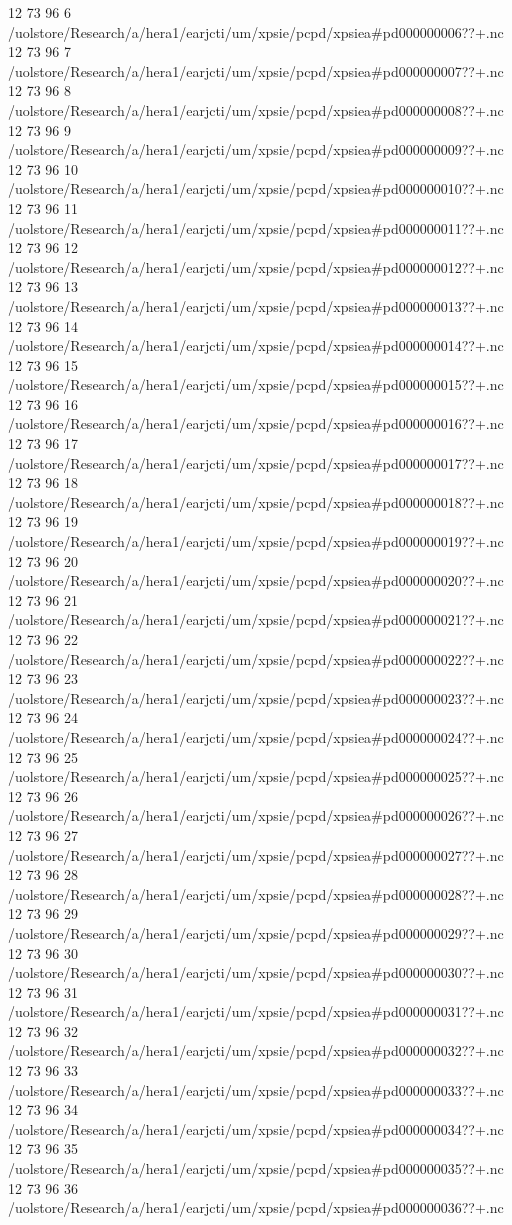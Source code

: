 12 73 96
6
/uolstore/Research/a/hera1/earjcti/um/xpsie/pcpd/xpsiea#pd000000006??+.nc
12 73 96
7
/uolstore/Research/a/hera1/earjcti/um/xpsie/pcpd/xpsiea#pd000000007??+.nc
12 73 96
8
/uolstore/Research/a/hera1/earjcti/um/xpsie/pcpd/xpsiea#pd000000008??+.nc
12 73 96
9
/uolstore/Research/a/hera1/earjcti/um/xpsie/pcpd/xpsiea#pd000000009??+.nc
12 73 96
10
/uolstore/Research/a/hera1/earjcti/um/xpsie/pcpd/xpsiea#pd000000010??+.nc
12 73 96
11
/uolstore/Research/a/hera1/earjcti/um/xpsie/pcpd/xpsiea#pd000000011??+.nc
12 73 96
12
/uolstore/Research/a/hera1/earjcti/um/xpsie/pcpd/xpsiea#pd000000012??+.nc
12 73 96
13
/uolstore/Research/a/hera1/earjcti/um/xpsie/pcpd/xpsiea#pd000000013??+.nc
12 73 96
14
/uolstore/Research/a/hera1/earjcti/um/xpsie/pcpd/xpsiea#pd000000014??+.nc
12 73 96
15
/uolstore/Research/a/hera1/earjcti/um/xpsie/pcpd/xpsiea#pd000000015??+.nc
12 73 96
16
/uolstore/Research/a/hera1/earjcti/um/xpsie/pcpd/xpsiea#pd000000016??+.nc
12 73 96
17
/uolstore/Research/a/hera1/earjcti/um/xpsie/pcpd/xpsiea#pd000000017??+.nc
12 73 96
18
/uolstore/Research/a/hera1/earjcti/um/xpsie/pcpd/xpsiea#pd000000018??+.nc
12 73 96
19
/uolstore/Research/a/hera1/earjcti/um/xpsie/pcpd/xpsiea#pd000000019??+.nc
12 73 96
20
/uolstore/Research/a/hera1/earjcti/um/xpsie/pcpd/xpsiea#pd000000020??+.nc
12 73 96
21
/uolstore/Research/a/hera1/earjcti/um/xpsie/pcpd/xpsiea#pd000000021??+.nc
12 73 96
22
/uolstore/Research/a/hera1/earjcti/um/xpsie/pcpd/xpsiea#pd000000022??+.nc
12 73 96
23
/uolstore/Research/a/hera1/earjcti/um/xpsie/pcpd/xpsiea#pd000000023??+.nc
12 73 96
24
/uolstore/Research/a/hera1/earjcti/um/xpsie/pcpd/xpsiea#pd000000024??+.nc
12 73 96
25
/uolstore/Research/a/hera1/earjcti/um/xpsie/pcpd/xpsiea#pd000000025??+.nc
12 73 96
26
/uolstore/Research/a/hera1/earjcti/um/xpsie/pcpd/xpsiea#pd000000026??+.nc
12 73 96
27
/uolstore/Research/a/hera1/earjcti/um/xpsie/pcpd/xpsiea#pd000000027??+.nc
12 73 96
28
/uolstore/Research/a/hera1/earjcti/um/xpsie/pcpd/xpsiea#pd000000028??+.nc
12 73 96
29
/uolstore/Research/a/hera1/earjcti/um/xpsie/pcpd/xpsiea#pd000000029??+.nc
12 73 96
30
/uolstore/Research/a/hera1/earjcti/um/xpsie/pcpd/xpsiea#pd000000030??+.nc
12 73 96
31
/uolstore/Research/a/hera1/earjcti/um/xpsie/pcpd/xpsiea#pd000000031??+.nc
12 73 96
32
/uolstore/Research/a/hera1/earjcti/um/xpsie/pcpd/xpsiea#pd000000032??+.nc
12 73 96
33
/uolstore/Research/a/hera1/earjcti/um/xpsie/pcpd/xpsiea#pd000000033??+.nc
12 73 96
34
/uolstore/Research/a/hera1/earjcti/um/xpsie/pcpd/xpsiea#pd000000034??+.nc
12 73 96
35
/uolstore/Research/a/hera1/earjcti/um/xpsie/pcpd/xpsiea#pd000000035??+.nc
12 73 96
36
/uolstore/Research/a/hera1/earjcti/um/xpsie/pcpd/xpsiea#pd000000036??+.nc
